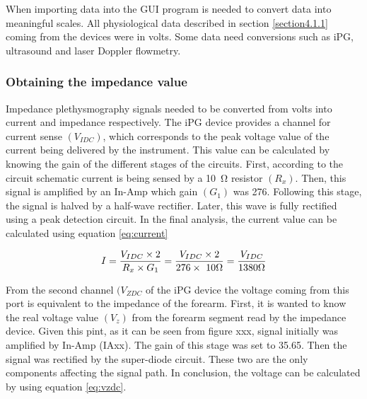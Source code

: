 When importing data into the GUI program is needed to convert data into meaningful scales. All physiological data described in section \ref{section4.1.1} coming from the devices were in volts. Some data need conversions such as iPG, ultrasound and laser Doppler flowmetry.


\subsubsection{Obtaining the impedance value}
Impedance plethysmography signals needed to be converted from volts into current and impedance respectively. The iPG device provides a channel for current sense $(V_{IDC})$, which corresponds to the peak voltage value of the current being delivered by the instrument. This value can be calculated by knowing the gain of the different stages of the circuits. First, according to the circuit schematic current is being sensed by a \SI{10}{\ohm} resistor $(R_x)$. Then, this signal is amplified by an In-Amp which gain $(G_1)$ was 276. Following this stage, the signal is halved by a half-wave rectifier. Later, this wave is fully rectified using a peak detection circuit. In the final analysis, the current value can be calculated using equation \ref{eq:current}

\begin{align}
	\label{eq:current}
	I = \frac{V_{IDC} \times 2}{R_x \times G_1} = \frac{V_{IDC} \times 2}{276 \times\ 10 \Omega} = \frac{V_{IDC}}{1380 \Omega} \tagaddtext{[\si{\ampere}]}
\end{align}


From the second channel $(V_{ZDC}$ of the iPG device the voltage coming from this port is equivalent to the impedance of the forearm. First, it is wanted to know the real voltage value $(V_z)$ from the forearm segment read by the impedance device. Given this pint, as it can be seen from figure xxx, signal initially was amplified by In-Amp (IAxx). The gain of this stage was set to 35.65. Then the signal was rectified by the super-diode circuit. These two are the only components affecting the signal path. In conclusion, the voltage can be calculated by using equation \ref{eq:vzdc}.

